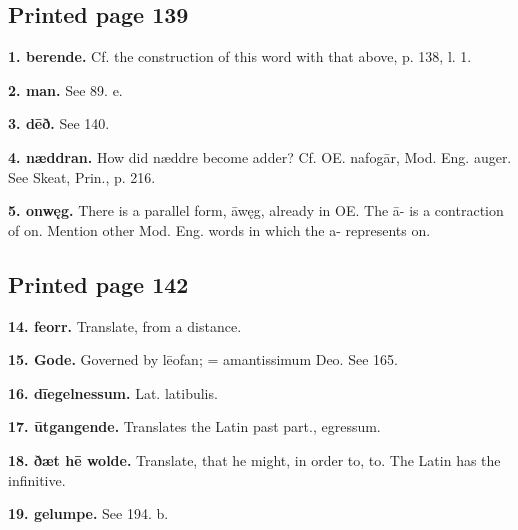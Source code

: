\subsection*{Printed page 139}

\textbf{1. berende.} Cf. the construction of this word with that above, p. 138, l. 1.

\textbf{2. man.} See 89. e.

\textbf{3. dēð.} See 140.

\textbf{4. næddran.} How did næddre become adder? Cf. OE. nafogār, Mod. Eng. auger. See Skeat, Prin., p. 216.

\textbf{5. onwęg.} There is a parallel form, āwęg, already in OE. The ā- is a contraction of on. Mention other Mod. Eng. words in which the a- represents on.

\subsection*{Printed page 142}

\textbf{14. feorr.} Translate, from a distance.

\textbf{15. Gode.} Governed by lēofan; = amantissimum Deo. See 165.

\textbf{16. dīegelnessum.} Lat. latibulis.

\textbf{17. ūtgangende.} Translates the Latin past part., egressum.

\textbf{18. ðæt hē wolde.} Translate, that he might, in order to, to. The Latin has the infinitive.

\textbf{19. gelumpe.} See 194. b.


